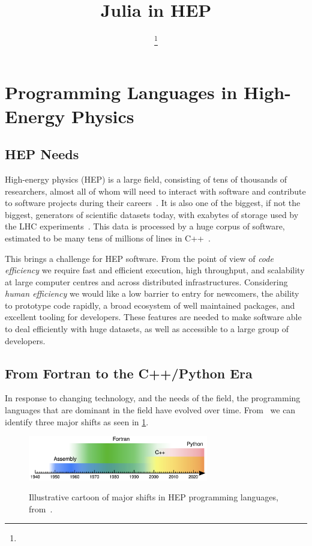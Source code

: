 \documentclass{webofc}
\title{Julia in HEP}
\author{\firstname{Graeme Andrew} \lastname{Stewart}\inst{1}\fnsep\thanks{\email{graeme.andrew.stewart@cern.ch}} \and
\firstname{Other} \lastname{People}\inst{2}
}
\institute{CERN, Esplanade des Particules 1, Geneva, Switzerland
\and
Some Other Place
}
\begin{document}
\maketitle

\section{Programming Languages in High-Energy Physics}
\label{sec:introduction}

\subsection{HEP Needs}

High-energy physics (HEP) is a large field, consisting of tens of thousands of
researchers, almost all of whom will need to interact with software and
contribute to software projects during their careers~\cite{2024EPJWC.29505023M}.
It is also one of the biggest, if not the biggest, generators of scientific
datasets today, with exabytes of storage used by the LHC
experiments~\cite{Collaboration:2904204}. This data is processed by a huge
corpus of software, estimated to be many tens of millions of lines in
C++~\cite{hsfcwp}.

This brings a challenge for HEP software. From the point of view of \emph{code
efficiency} we require fast and efficient execution, high throughput, and
scalability at large computer centres and across distributed infrastructures.
Considering \emph{human efficiency} we would like a low barrier to entry for
newcomers, the ability to prototype code rapidly, a broad ecosystem of well
maintained packages, and excellent tooling for developers. These features are
needed to make software able to deal efficiently with huge datasets, as well as
accessible to a large group of developers.

\subsection{From Fortran to the C++/Python Era}

In response to changing technology, and the needs of the field, the programming
languages that are dominant in the field have evolved over time.
From~\cite{pivarski2022} we can identify three major shifts as seen in
\ref{fig:hep-languages}. 

\begin{figure}[htbp]
    \begin{center}
        \includegraphics[width=0.7\textwidth]{hep-programming-languages.png} \\ 
        \caption{Illustrative cartoon of major shifts in HEP programming languages, from~\cite{pivarski2022}.}
        \label{fig:hep-languages}
    \end{center}
\end{figure}
\end{document}
